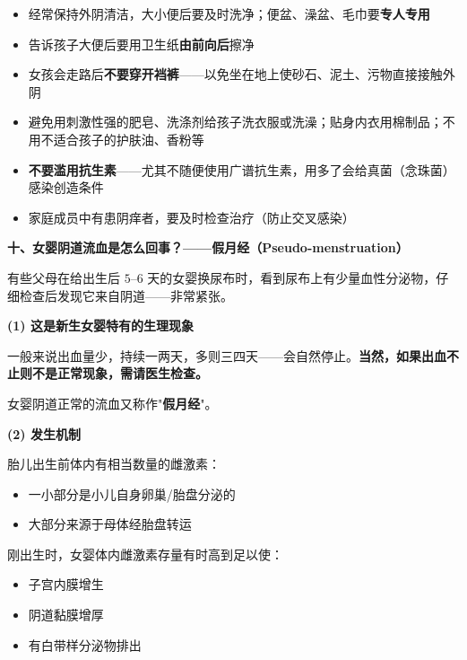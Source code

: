 \begin{enumerate}
\begin{tcolorbox}[colback=pink!5!white,colframe=red!50!black,title=贴心小叮咛 —— 预防女孩外阴炎、阴道炎六要点]
\begin{itemize}
	\item[$\diamond$] 经常保持外阴清洁，大小便后要及时洗净；便盆、澡盆、毛巾要\textbf{专人专用}
	\item[$\diamond$] 告诉孩子大便后要用卫生纸\textbf{由前向后}擦净
	\item[$\diamond$] 女孩会走路后\textbf{不要穿开裆裤}——以免坐在地上使砂石、泥土、污物直接接触外阴
	\item[$\diamond$] 避免用刺激性强的肥皂、洗涤剂给孩子洗衣服或洗澡；贴身内衣用棉制品；不用不适合孩子的护肤油、香粉等
	\item[$\diamond$] \textbf{不要滥用抗生素}——尤其不随便使用广谱抗生素，用多了会给真菌（念珠菌）感染创造条件
	\item[$\diamond$] 家庭成员中有患阴痒者，要及时检查治疗（防止交叉感染）
\end{itemize}
\end{tcolorbox}

\vspace{0.8em}
\noindent\textbf{十、女婴阴道流血是怎么回事？——假月经（Pseudo-menstruation）}

有些父母在给出生后 $5$--$6$ 天的女婴换尿布时，看到尿布上有少量血性分泌物，仔细检查后发现它来自阴道——非常紧张。

\vspace{0.3em}
\noindent\textbf{(1) 这是新生女婴特有的生理现象}

一般来说出血量少，持续一两天，多则三四天——会自然停止。\textbf{当然，如果出血不止则不是正常现象，需请医生检查。}

女婴阴道正常的流血又称作"\textbf{假月经}"。

\vspace{0.3em}
\noindent\textbf{(2) 发生机制}

胎儿出生前体内有相当数量的雌激素：
\begin{itemize}
	\item 一小部分是小儿自身卵巢/胎盘分泌的
	\item 大部分来源于母体经胎盘转运
\end{itemize}

刚出生时，女婴体内雌激素存量有时高到足以使：
\begin{itemize}
	\item 子宫内膜增生
	\item 阴道黏膜增厚
	\item 有白带样分泌物排出
\end{itemize}


\end{enumerate}
